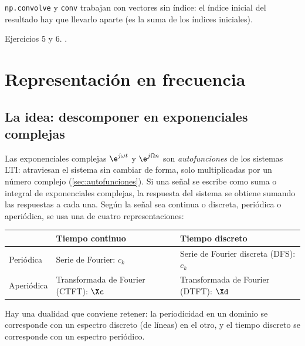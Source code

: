 \documentclass[11pt,a4paper]{scrartcl}
\begin{document}
\begin{encodigo}
  \texttt{np.convolve} y \texttt{conv} trabajan con vectores sin índice: el índice inicial del resultado hay que llevarlo aparte (es la suma de los índices iniciales).
\end{encodigo}

\begin{flushright}\small\color{pdsgris}Ejercicios 5 y 6. .\end{flushright}

\section{Representación en frecuencia}\label{sec:frecuencia}

\subsection{La idea: descomponer en exponenciales complejas}

Las exponenciales complejas $\e^{j\omega t}$ y $\e^{j\Omega n}$ son \emph{autofunciones} de los sistemas LTI: atraviesan el sistema sin cambiar de forma, solo multiplicadas por un número complejo (\cref{sec:autofunciones}). Si una señal se escribe como suma o integral de exponenciales complejas, la respuesta del sistema se obtiene sumando las respuestas a cada una. Según la señal sea continua o discreta, periódica o aperiódica, se usa una de cuatro representaciones:

\begin{center}
  \renewcommand{\arraystretch}{1.2}
  \begin{tabular}{@{}lll@{}}
    \toprule
    & Tiempo continuo & Tiempo discreto\\\midrule
    Periódica & Serie de Fourier: $c_k$ & Serie de Fourier discreta (DFS): $c_k$\\
    Aperiódica & Transformada de Fourier (CTFT): $\Xc$ & Transformada de Fourier (DTFT): $\Xd$\\\bottomrule
  \end{tabular}
\end{center}

Hay una dualidad que conviene retener: la periodicidad en un dominio se corresponde con un espectro discreto (de líneas) en el otro, y el tiempo discreto se corresponde con un espectro periódico.
\end{document}
